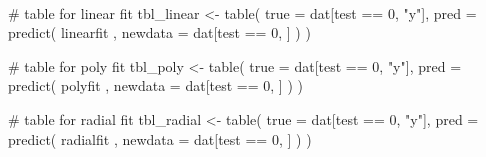 \documentclass[
  a4paperpaper,
]{article}
\newenvironment{Shaded}{\begin{snugshade}}{\end{snugshade}}
\newcommand{\AttributeTok}[1]{\textcolor[rgb]{0.40,0.45,0.13}{#1}}
\newcommand{\CommentTok}[1]{\textcolor[rgb]{0.37,0.37,0.37}{#1}}
\newcommand{\DecValTok}[1]{\textcolor[rgb]{0.68,0.00,0.00}{#1}}
\newcommand{\FunctionTok}[1]{\textcolor[rgb]{0.28,0.35,0.67}{#1}}
\newcommand{\NormalTok}[1]{\textcolor[rgb]{0.00,0.23,0.31}{#1}}
\newcommand{\OtherTok}[1]{\textcolor[rgb]{0.00,0.23,0.31}{#1}}
\newcommand{\SpecialCharTok}[1]{\textcolor[rgb]{0.37,0.37,0.37}{#1}}
\newcommand{\StringTok}[1]{\textcolor[rgb]{0.13,0.47,0.30}{#1}}
\begin{document}
~

\begin{Shaded}
\begin{Highlighting}[]
\CommentTok{\# table for linear fit}
\NormalTok{tbl\_linear }\OtherTok{\textless{}{-}} \FunctionTok{table}\NormalTok{(}
  \AttributeTok{true =}\NormalTok{ dat[test }\SpecialCharTok{==} \DecValTok{0}\NormalTok{, }\StringTok{"y"}\NormalTok{],}
  \AttributeTok{pred =} \FunctionTok{predict}\NormalTok{(}
\NormalTok{    linearfit , }\AttributeTok{newdata =}\NormalTok{ dat[test }\SpecialCharTok{==} \DecValTok{0}\NormalTok{, ]}
\NormalTok{  )}
\NormalTok{)}

\CommentTok{\# table for poly fit}
\NormalTok{tbl\_poly }\OtherTok{\textless{}{-}} \FunctionTok{table}\NormalTok{(}
  \AttributeTok{true =}\NormalTok{ dat[test }\SpecialCharTok{==} \DecValTok{0}\NormalTok{, }\StringTok{"y"}\NormalTok{],}
  \AttributeTok{pred =} \FunctionTok{predict}\NormalTok{(}
\NormalTok{    polyfit , }\AttributeTok{newdata =}\NormalTok{ dat[test }\SpecialCharTok{==} \DecValTok{0}\NormalTok{, ]}
\NormalTok{  )}
\NormalTok{)}

\CommentTok{\# table for radial fit}
\NormalTok{tbl\_radial }\OtherTok{\textless{}{-}} \FunctionTok{table}\NormalTok{(}
  \AttributeTok{true =}\NormalTok{ dat[test }\SpecialCharTok{==} \DecValTok{0}\NormalTok{, }\StringTok{"y"}\NormalTok{],}
  \AttributeTok{pred =} \FunctionTok{predict}\NormalTok{(}
\NormalTok{    radialfit , }\AttributeTok{newdata =}\NormalTok{ dat[test }\SpecialCharTok{==} \DecValTok{0}\NormalTok{, ]}
\NormalTok{  )}
\NormalTok{)}


\end{Highlighting}
\end{Shaded}
\end{document}
